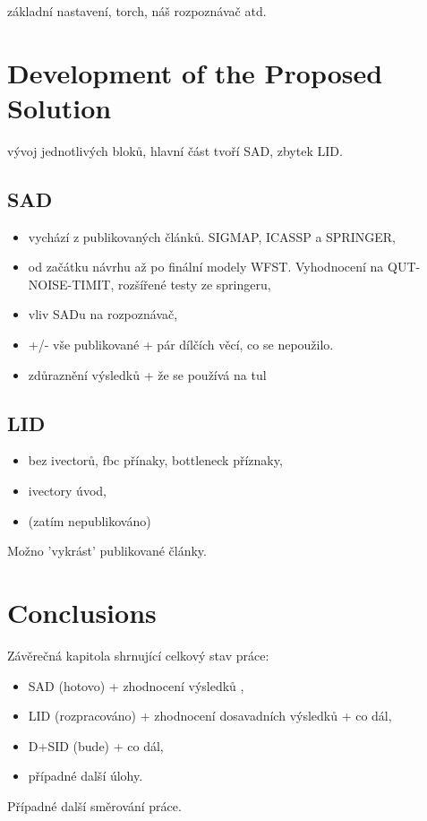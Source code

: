 \documentclass[FM,noheader,EN]{tulthesis}
\begin{document}
základní nastavení, torch, náš rozpoznávač atd.


\chapter{Development of the Proposed Solution}
vývoj jednotlivých bloků, hlavní část tvoří SAD, zbytek LID.

\section{SAD}
\begin{itemize}
	\item vychází z publikovaných článků. SIGMAP, ICASSP a SPRINGER,
	\item od začátku návrhu až po finální modely WFST. Vyhodnocení na QUT-NOISE-TIMIT, rozšířené testy ze springeru,
	\item vliv SADu na rozpoznávač, 
	\item +/- vše publikované + pár dílčích věcí, co se nepoužilo.
	\item zdůraznění výsledků + že se používá na tul
\end{itemize}	

\section{LID}
\begin{itemize}
	\item bez ivectorů, fbc přínaky, bottleneck příznaky,
	\item ivectory úvod,
	\item (zatím nepublikováno)
\end{itemize}	

Možno 'vykrást' publikované články.


\chapter{Conclusions}
Závěrečná kapitola shrnující celkový stav práce:
\begin{itemize}
	\item SAD (hotovo) + zhodnocení výsledků \cite{SIGMAP16} \cite{ICASSP17} \cite{SPRINGER17}, 
	\item LID (rozpracováno) + zhodnocení dosavadních výsledků + co dál,
	\item D+SID (bude) + co dál,
	\item případné další úlohy.
\end{itemize}	
Případné další směrování práce.
\end{document}
